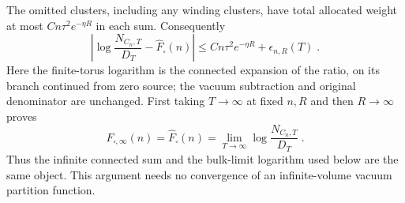 \documentclass[11pt]{article}
\begin{document}
The omitted clusters, including any winding clusters, have total allocated weight at most $Cn\tau^2e^{-\eta R}$ in each sum. Consequently
\begin{equation}\label{eq:corner-fixed-square-limit-bound}
    \left|\log\frac{N_{C_n,T}}{D_T}
        -\widehat F_\square(n)\right|
        \leq Cn\tau^2e^{-\eta R}+\epsilon_{n,R}(T)\;.
\end{equation}
Here the finite-torus logarithm is the connected expansion of the ratio, on its branch continued from zero source; the vacuum subtraction and original denominator are unchanged. First taking $T\to\infty$ at fixed $n,R$ and then $R\to\infty$ proves
\begin{equation}\label{eq:corner-fixed-square-limit}
    F_{\square,\infty}(n)
        =\widehat F_\square(n)
        =\lim_{T\to\infty}\log\frac{N_{C_n,T}}{D_T}\;.
\end{equation}
Thus the infinite connected sum and the bulk-limit logarithm used below are the same object. This argument needs no convergence of an infinite-volume vacuum partition function.
\end{document}
